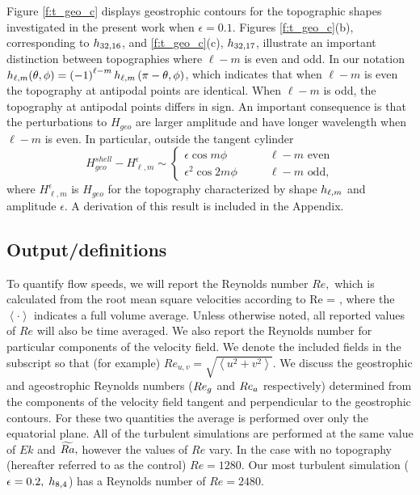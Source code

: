 Figure \ref{f:t_geo_c} displays geostrophic contours for the topographic shapes investigated in the present work when $\epsilon  = 0.1$. 
Figures \ref{f:t_geo_c}(b), corresponding to $h_{32,16}$, and \ref{f:t_geo_c}(c), $h_{32,17}$, illustrate an important distinction between topographies where $\ell - m$ is even and odd.
In our notation $h_{\ell,m} (\theta,\phi) = \left ( -1\right ) ^{\ell - m} h_{\ell,m}\left ( \pi-\theta,\phi\right ) $, which indicates that when $\ell - m$ is even the topography at antipodal points are identical. When $\ell - m$ is odd, the topography at antipodal points differs in sign.
An important consequence is that the perturbations to $H_{geo}$ are larger amplitude and have longer wavelength when $\ell-m $ is even. In particular, outside the tangent cylinder
\begin{equation}
	H_{geo}^{shell}- H_{\ell,m}^{\epsilon}\sim
	\begin{cases}
		 \epsilon  \cos m\phi\qquad &\ell - m \text{ even}\\
		 \epsilon^{2}  \cos 2m\phi\qquad &\ell - m \text{ odd,}
	\end{cases}
	\label{e:h_geo}
\end{equation}
where $H_{\ell,m}^{\epsilon}$ is $H_{geo}$ for the topography characterized by shape $h_{\ell,m}$ and amplitude $\epsilon$.
A derivation of this result is included in the Appendix.

\subsection{Output/definitions}

To quantify flow speeds, we will report the Reynolds number $Re,$ which is calculated from the root mean square velocities according to
\be
Re = \sqrt{\left<\ub\cdot\ub\right>},
	\label{e:re}
	\ee
where the $\left< \cdot\right>$ indicates a full volume average. Unless otherwise noted, all reported values of $Re$ will also be time averaged. 
We also report the Reynolds number for particular components of the velocity field. 
We denote the included fields in the subscript so that (for example) $Re_{u,v}= \sqrt{\left<u^{2} + v^{2}\right>}$.
We discuss the geostrophic and ageostrophic Reynolds numbers ($Re_{{g}}$ and $Re_{{a}}$ respectively) determined from the components of the velocity field tangent and perpendicular to the geostrophic contours. For these two quantities the average is performed over only the equatorial plane. All of the turbulent simulations are performed at the same value of $Ek$ and $\widetilde{Ra},$ however the values of $Re$ vary. In the case with no topography (hereafter referred to as the control) $Re = 1280.$ Our most turbulent simulation ($\epsilon=  0.2, \;h_{8,4}$) has a Reynolds number of $Re = 2480$.


